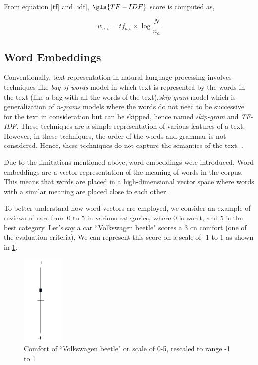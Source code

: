 From equation \ref{tf} and \ref{idf}, $\gls{TF-IDF}$ score is computed as,

\begin{equation}\label{tf-idf}
w_{a,b} = tf_{a,b} \times \log\frac{N}{n_{a}}
\end{equation}

\subsection{Word Embeddings}
Conventionally, text representation in natural language processing involves techniques like \textit{bag-of-words} model in which text is represented by the words in the text (like a bag with all the words of the text),\textit{skip-gram} model which is generalization of \textit{n-grams} models where the words do not need to be successive for the text in consideration but can be skipped, hence named \textit{skip-gram} \cite{guthrie2006closer} and  \textit{\gls{TF-IDF}}. These techniques are a simple representation of various features of a text. However, in these techniques, the order of the words and grammar is not considered. Hence, these techniques do not capture the semantics of the text. \cite{maas2011learning}.

Due to the limitations mentioned above, word embeddings were introduced. Word embeddings are a vector representation of the meaning of words in the corpus. This means that words are placed in a high-dimensional vector space where words with a similar meaning are placed close to each other.

To better understand how word vectors are employed, we consider an example of reviews of cars from 0 to 5 in various categories, where 0 is worst, and 5 is the best category. Let's say a car ``Volkswagen beetle" scores a 3 on comfort (one of the evaluation criteria). We can represent this score on a scale of -1 to 1 as shown in \ref{fig:volkswagan_example}.

\begin{figure}[!ht]
    \centering
    \includegraphics[width=2cm]{pics/wordVec.jpg}
    \captionsetup{justification=centering,margin=2cm}
    \caption{Comfort of ``Volkswagen beetle" on scale of 0-5, rescaled to range -1 to 1}
    \label{fig:volkswagan_example}
\end{figure}


